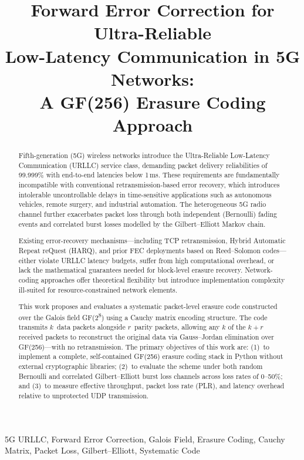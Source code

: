 \documentclass[conference]{IEEEtran}
\title{Forward Error Correction for Ultra-Reliable\\
       Low-Latency Communication in 5G Networks:\\
       A GF(256) Erasure Coding Approach}
\author{
  \IEEEauthorblockN{[Author Name]}
  \IEEEauthorblockA{Department of [Your Department]\\
    [Your Institution]\\
    Email: [your@email.edu]}
}
\begin{document}
\maketitle

\begin{abstract}
Fifth-generation (5G) wireless networks introduce the Ultra-Reliable
Low-Latency Communication (URLLC) service class, demanding packet
delivery reliabilities of 99.999\% with end-to-end latencies below
1\,ms. These requirements are fundamentally incompatible with
conventional retransmission-based error recovery, which introduces
intolerable uncontrollable delays in time-sensitive applications such as
autonomous vehicles, remote surgery, and industrial automation. The
heterogeneous 5G radio channel further exacerbates packet loss through
both independent (Bernoulli) fading events and correlated burst losses
modelled by the Gilbert--Elliott Markov chain.

Existing error-recovery mechanisms---including TCP retransmission, Hybrid
Automatic Repeat reQuest (HARQ), and prior FEC deployments based on
Reed--Solomon codes---either violate URLLC latency budgets, suffer from
high computational overhead, or lack the mathematical guarantees needed
for block-level erasure recovery. Network-coding approaches offer
theoretical flexibility but introduce implementation complexity
ill-suited for resource-constrained network elements.

This work proposes and evaluates a systematic packet-level erasure code
constructed over the Galois field GF(2\textsuperscript{8}) using a
Cauchy matrix encoding structure. The code transmits $k$~data packets
alongside $r$~parity packets, allowing any $k$ of the $k{+}r$ received
packets to reconstruct the original data via Gauss--Jordan elimination
over GF(256)---with no retransmission. The primary objectives of this
work are: (1)~to implement a complete, self-contained GF(256) erasure
coding stack in Python without external cryptographic libraries; (2)~to
evaluate the scheme under both random Bernoulli and correlated
Gilbert--Elliott burst loss channels across loss rates of 0--50\%; and
(3)~to measure effective throughput, packet loss rate (PLR), and latency
overhead relative to unprotected UDP transmission.
\end{abstract}

\begin{IEEEkeywords}
5G URLLC, Forward Error Correction, Galois Field, Erasure Coding,
Cauchy Matrix, Packet Loss, Gilbert--Elliott, Systematic Code
\end{IEEEkeywords}
\end{document}

